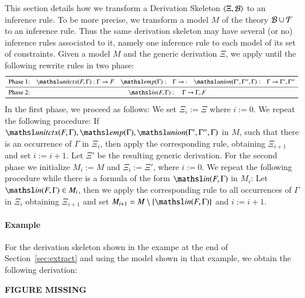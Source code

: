 \documentclass[a4paper,10pt]{article}
\newcommand\thSeq{\ensuremath{\Tscr}}
\newcommand{\elin}[2]{\ensuremath{{\tsl{unitctx}(\ensuremath{#1}, \ensuremath{#2})}}}
\newcommand{\emp}[1]{\ensuremath{{\tsl{emp}(\ensuremath{#1})}}}
\newcommand{\union}[3]{\ensuremath{{\tsl{union}(\ensuremath{#1},\ensuremath{#2},\ensuremath{ #3})}}}
\newcommand{\In}[2]{\ensuremath{\tsl{in}(\ensuremath{#1},\ensuremath{#2})}}
\begin{document}
This section details how we transform a Derivation Skeleton $\langle\Xi, {\cal B}\rangle$ to an 
inference rule. To be more precise, we transform a model $M$ of the theory $\Bscr \cup \thSeq$
to an inference rule. Thus the same derivation skeleton may have several (or no) inference rules associated 
to it, namely one inference rule to each model of its set of constraints. Given a model $M$ and the generic
derivation $\Xi$, we apply until the following rewrite rules in two phase:
\[
\begin{array}{l@{\quad}r@{~}l@{\quad}r@{\quad}l@{\quad}r@{\quad}l}
\toprule
{\textrm{Phase 1:}} 
& \elin{F}{\Gamma}:  & \Gamma \rightarrow F 
& \emp{\Gamma}: & \Gamma \rightarrow \cdot 
& \union{\Gamma'}{\Gamma''}{\Gamma}: & \Gamma \rightarrow \Gamma',
\Gamma''\\
\midrule
\textrm{Phase 2:} & \multicolumn{6}{c}{
\In{F}{\Gamma}: \quad \Gamma \rightarrow \Gamma, F
}\\
\bottomrule
\end{array}
\]
In the first phase, we proceed as follows: We set $\Xi_i := \Xi$ where $ i := 0$.
We repeat the following procedure: If 
$\elin{F}{\Gamma}, \emp{\Gamma}, \union{\Gamma'}{\Gamma''}{\Gamma}$ in $M$, such 
that there is an occurrence of $\Gamma$ in $\Xi_i$, then apply the corresponding 
rule, obtaining $\Xi_{i+1}$ and set $i := i + 1$. 
Let $\Xi'$ be the resulting generic derivation.
For the second phase we initialize $M_i := M$ and $\Xi_i := \Xi'$, where $i := 0$. We repeat 
the following procedure while there is a formula of the form $\In{F}{\Gamma}$ in $M_i$:
Let $\In{F}{\Gamma} \in M_i$, then we apply the corresponding rule to all occurrences of $\Gamma$ in $\Xi_i$
obtaining $\Xi_{i+1}$ and set $M_{i+1} = M \setminus \{\In{F}{\Gamma}\}$  and $i := i + 1$.

\paragraph{Example}
For the derivation skeleton shown in the exampe at the end of 
Section~\ref{sec:extract} and using the model shown in that example, we obtain the following derivation:

\textbf{FIGURE MISSING}
\end{document}
